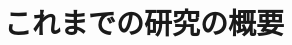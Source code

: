 \documentclass[dvipdfmx, xcolor=svgnames]{beamer}
\theoremstyle{plain}
\theoremstyle{definition}
\theoremstyle{remark}
\begin{document}
    
    


\section{これまでの研究の概要}
\end{document}
